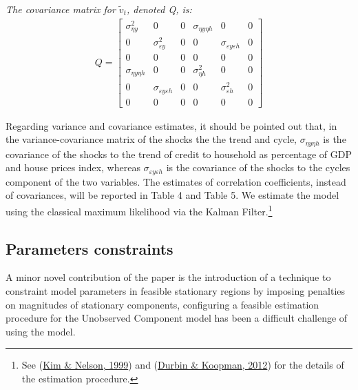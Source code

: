 \documentclass[
  12pt,
]{article}
\begin{document}
        \bigskip
        \textit{The covariance matrix for $\tilde{v}_t$, denoted Q, is: }
        \begin{align}
        Q = 
        \begin{bmatrix}
        \sigma^2_{\eta y}   & 0  &0 & \sigma_{\eta y \eta h}    & 0 & 0 \\
        0   & \sigma^2_{\varepsilon y}  & 0 & 0 & \sigma_{\varepsilon y \varepsilon h}  & 0 \\
        0   &   0   & 0 & 0 & 0 & 0 \\
        \sigma_{\eta y \eta h}  & 0 & 0 & \sigma^2_{\eta h} & 0 & 0 \\
        0   & \sigma_{\varepsilon y \varepsilon h}  & 0 & 0 & \sigma^2_{\varepsilon h}      & 0 \\
        0   &0  & 0 & 0
        & 0 & 0
        \end{bmatrix}
        \end{align}
        
        \bigskip
        

Regarding variance and covariance estimates, it should be pointed out that, in the variance-covariance matrix of the shocks the the trend and cycle, \(\sigma_{\eta y \eta h}\) is the covariance of the shocks to the trend of credit to household as percentage of GDP and house prices index, whereas \(\sigma_{\varepsilon y \varepsilon h}\) is the covariance of the shocks to the cycles component of the two variables. The estimates of correlation coefficients, instead of covariances, will be reported in Table 4 and Table 5. We estimate the model using the classical maximum likelihood via the Kalman Filter.\footnote{See (\protect\hyperlink{ref-kim_state-space_1999}{Kim \& Nelson, 1999}) and (\protect\hyperlink{ref-durbin_time_2012}{Durbin \& Koopman, 2012}) for the details of the estimation procedure.}

\hypertarget{parameters-constraints}{%
\subsection{Parameters constraints}\label{parameters-constraints}}

A minor novel contribution of the paper is the introduction of a technique to constraint model parameters in feasible stationary regions by imposing penalties on magnitudes of stationary components, configuring a feasible estimation procedure for the Unobserved Component model has been a difficult challenge of using the model.
\end{document}

